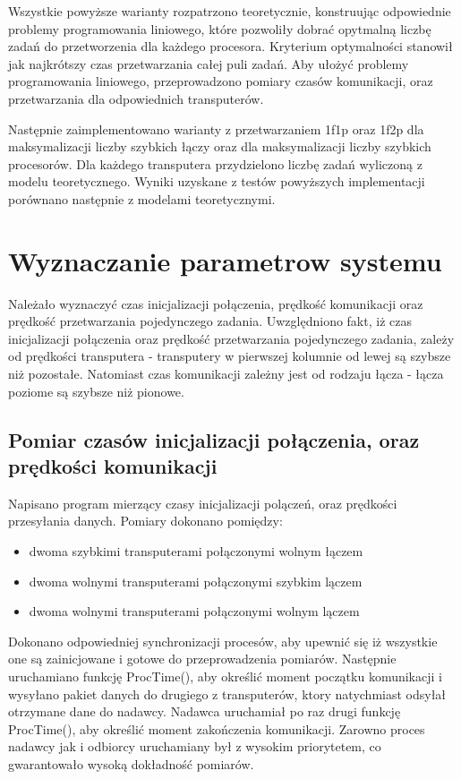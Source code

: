 \documentclass[a4paper,11pt, titlepage]{article}
\begin{document}
Wszystkie powyższe warianty rozpatrzono teoretycznie, konstruując odpowiednie problemy programowania liniowego, które pozwoliły dobrać opytmalną liczbę zadań do przetworzenia dla każdego procesora. Kryterium optymalności stanowił jak najkrótszy czas przetwarzania całej puli zadań. Aby ułożyć problemy programowania liniowego, przeprowadzono pomiary czasów komunikacji, oraz przetwarzania dla odpowiednich transputerów.

Następnie zaimplementowano warianty z przetwarzaniem 1f1p oraz 1f2p dla maksymalizacji liczby szybkich łączy oraz dla maksymalizacji liczby szybkich procesorów. Dla każdego transputera przydzielono liczbę zadań wyliczoną z modelu teoretycznego. Wyniki uzyskane z testów powyższych implementacji porównano następnie z modelami teoretycznymi.

\section{Wyznaczanie parametrow systemu}
Należało wyznaczyć czas inicjalizacji połączenia, prędkość komunikacji oraz prędkość przetwarzania pojedynczego zadania. Uwzględniono fakt, iż czas inicjalizacji połączenia oraz prędkość przetwarzania pojedynczego zadania, zależy od prędkości transputera - transputery w pierwszej kolumnie od lewej są szybsze niż pozostałe. Natomiast czas komunikacji zależny jest od rodzaju łącza - łącza poziome są szybsze niż pionowe.

\subsection{Pomiar czasów inicjalizacji połączenia, oraz prędkości komunikacji}
Napisano program mierzący czasy inicjalizacji polączeń, oraz prędkości przesyłania danych. Pomiary dokonano pomiędzy:
\begin{itemize}
\item dwoma szybkimi transputerami połączonymi wolnym łączem
\item dwoma wolnymi transputerami połączonymi szybkim lączem
\item dwoma wolnymi transputerami połączonymi wolnym lączem
\end{itemize}
Dokonano odpowiedniej synchronizacji procesów, aby upewnić się iż wszystkie one są zainicjowane i gotowe do przeprowadzenia pomiarów. Następnie uruchamiano funkcję ProcTime(), aby określić moment początku komunikacji i wysyłano pakiet danych do drugiego z transputerów, ktory natychmiast odsyłał otrzymane dane do nadawcy. Nadawca uruchamiał po raz drugi funkcję ProcTime(), aby określić moment zakończenia komunikacji. Zarowno proces nadawcy jak i odbiorcy uruchamiany był z wysokim priorytetem, co gwarantowało wysoką dokładność pomiarów.
\end{document}
